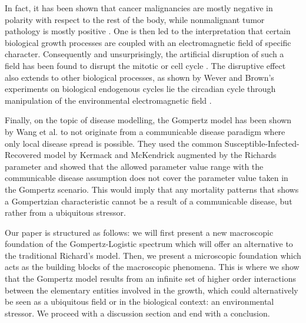 \documentclass{article}
\begin{document}
In fact, it has been shown that cancer malignancies are mostly negative in polarity with respect to the rest of the body, while nonmalignant tumor pathology is mostly positive \cite{langman1949technique}. One is then led to the interpretation that certain biological growth processes are coupled with an electromagnetic field of specific character. Consequently and unsurprisingly, the artificial disruption of such a field has been found to disrupt the mitotic or cell cycle \cite{goodman1983pulsing,liboff1981alternating,norton1984bioelectric,liboff1984time}. The disruptive effect also extends to other biological processes, as shown by Wever and Brown's experiments on biological endogenous cycles lie the circadian cycle through manipulation of the environmental electromagnetic field \cite{brown1976biological,wever1974elf}. 

Finally, on the topic of disease modelling, the Gompertz model has been shown by Wang et al. \cite{wang2012richards} to not originate from a communicable disease paradigm where only local disease spread is possible. They used the common Susceptible-Infected-Recovered model by Kermack and McKendrick \cite{kermack1927contribution} augmented by the Richards parameter and showed that the allowed parameter value range with the communicable disease assumption does not cover the parameter value taken in the Gompertz scenario. This would imply that any mortality patterns that shows a Gompertzian characteristic cannot be a result of a communicable disease, but rather from a ubiquitous stressor. 

Our paper is structured as follows: we will first present a new macroscopic foundation of the Gompertz-Logistic spectrum which will offer an alternative to the traditional Richard's model. Then, we present a microscopic foundation which acts as the building blocks of the macroscopic phenomena. This is where we show that the Gompertz model results from an infinite set of higher order interactions between the elementary entities involved in the growth, which could alternatively be seen as a ubiquitous field or in the biological context: an environmental stressor. We proceed with a discussion section and end with a conclusion.



  
\end{document}
